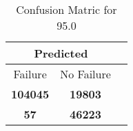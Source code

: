 \begin{table}[] 
\caption{Confusion Matric for 95.0} 
\label{Table: Prediction Accuracy-DMD95.0OnlySunEKF-resetReflectionEKF-top2-Reflection} 
\centering 
\begin{tabular} 
 {@{}ccc@{}} 
\toprule 
\multicolumn{2}{c}{\textbf{Predicted}}
 \\ \midrule 
\multicolumn{1}{|c|}{Failure} & 
\multicolumn{1}{c|}{No Failure}
 \\ \midrule 
\multicolumn{1}{|c|}{\color{green}\textbf{104045}} & 
\multicolumn{1}{c|}{\color{red}\textbf{19803}}
 \\ \midrule 
\multicolumn{1}{|c|}{\color{red}\textbf{57}} & 
\multicolumn{1}{c|}{\color{green}\textbf{46223}}
 \\ \bottomrule 
\end{tabular} 
\end{table} 
